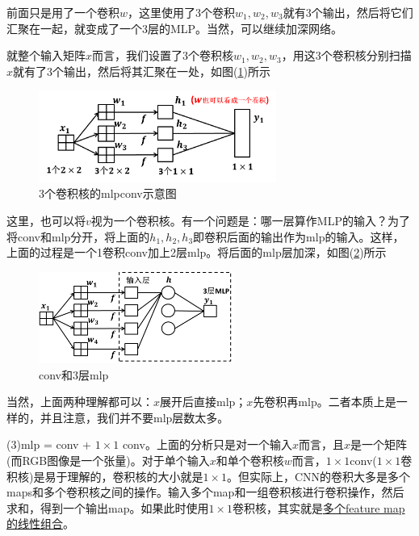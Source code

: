             前面只是用了一个卷积$w$，这里使用了3个卷积$w_1,w_2,w_3$就有3个输出，然后将它们汇聚在一起，就变成了一个3层的MLP。当然，可以继续加深网络。
            \par
            就整个输入矩阵$x$而言，我们设置了3个卷积核$w_1,w_2,w_3$，用这3个卷积核分别扫描$x$就有了3个输出，然后将其汇聚在一处，如图(\ref{fig:3个卷积核的mlpconv示意图})所示
             \begin{figure}[H]
            \centering
            \includegraphics[height=3cm]{images/3convolution_mlpconv.jpg}
            \caption{3个卷积核的mlpconv示意图}
            \label{fig:3个卷积核的mlpconv示意图}
            \end{figure}
            这里，也可以将$v$视为一个卷积核。有一个问题是：哪一层算作MLP的输入？为了将conv和mlp分开，将上面的$h_1,h_2,h_3$即卷积后面的输出作为mlp的输入。这样，上面的过程是一个1卷积conv加上2层mlp。将后面的mlp层加深，如图(\ref{fig:conv和3层mlp})所示
             \begin{figure}[H]
            \centering
            \includegraphics[height=3cm]{images/conv_and_3mlp.jpg}
            \caption{conv和3层mlp}
            \label{fig:conv和3层mlp}
            \end{figure}
            \par
            当然，上面两种理解都可以：$x$展开后直接mlp；$x$先卷积再mlp。二者本质上是一样的，并且注意，我们并不要mlp层数太多。
            \par
            (3)mlp = conv + $1\times 1$ conv。上面的分析只是对一个输入$x$而言，且$x$是一个矩阵(而RGB图像是一个张量)。对于单个输入$x$和单个卷积核$w$而言，$1\times 1$conv($1\times 1$卷积核)是易于理解的，卷积核的大小就是$1\times 1$。但实际上，CNN的卷积大多是多个maps和多个卷积核之间的操作。输入多个map和一组卷积核进行卷积操作，然后求和，得到一个输出map。如果此时使用$1\times 1$卷积核，其实就是\uline{多个feature map的线性组合}。
